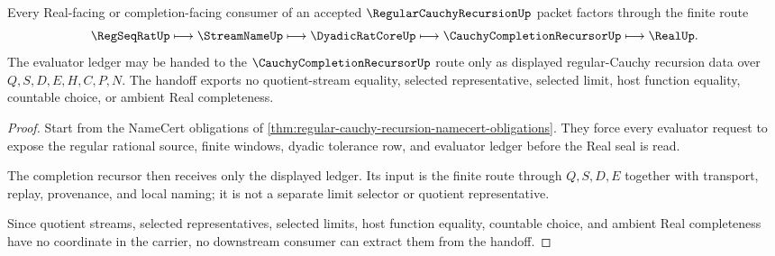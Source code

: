 \begin{theorem}
\label{thm:regular-cauchy-recursion-evaluation-handoff}
Every Real-facing or completion-facing consumer of an accepted $\RegularCauchyRecursionUp$ packet factors through the finite route
$$
\RegSeqRatUp \longmapsto \StreamNameUp \longmapsto \DyadicRatCoreUp \longmapsto \CauchyCompletionRecursorUp \longmapsto \RealUp .
$$
The evaluator ledger may be handed to the $\CauchyCompletionRecursorUp$ route only as displayed regular-Cauchy recursion data over $Q,S,D,E,H,C,P,N$. The handoff exports no quotient-stream equality, selected representative, selected limit, host function equality, countable choice, or ambient Real completeness.
\end{theorem}
\begin{proof}
Start from the NameCert obligations of \autoref{thm:regular-cauchy-recursion-namecert-obligations}. They force every evaluator request to expose the regular rational source, finite windows, dyadic tolerance row, and evaluator ledger before the Real seal is read.

The completion recursor then receives only the displayed ledger. Its input is the finite route through $Q,S,D,E$ together with transport, replay, provenance, and local naming; it is not a separate limit selector or quotient representative.

Since quotient streams, selected representatives, selected limits, host function equality, countable choice, and ambient Real completeness have no coordinate in the carrier, no downstream consumer can extract them from the handoff.
\end{proof}





